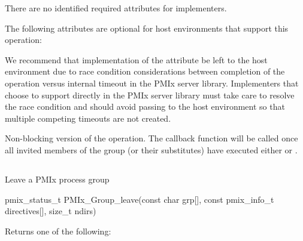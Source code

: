 \reqattrstart
There are no identified required attributes for implementers.

\reqattrend

\optattrstart
The following attributes are optional for host environments that support this operation:


\optattrend

\adviceimplstart
We recommend that implementation of the  attribute be left to the host environment due to race condition considerations between completion of the operation versus internal timeout in the \ac{PMIx} server library. Implementers that choose to support  directly in the \ac{PMIx} server library must take care to resolve the race condition and should avoid passing  to the host environment so that multiple competing timeouts are not created.
\adviceimplend

\descr

Non-blocking version of the  operation. The callback function will be called once all invited members of the group (or their substitutes) have executed either  or .


\subsection{}

\summary

Leave a \ac{PMIx} process group

\format

\cspecificstart
\begin{codepar}
pmix_status_t
PMIx_Group_leave(const char grp[],
                 const pmix_info_t directives[], size_t ndirs)
\end{codepar}
\cspecificend

\begin{arglist}
\end{arglist}

Returns one of the following:


